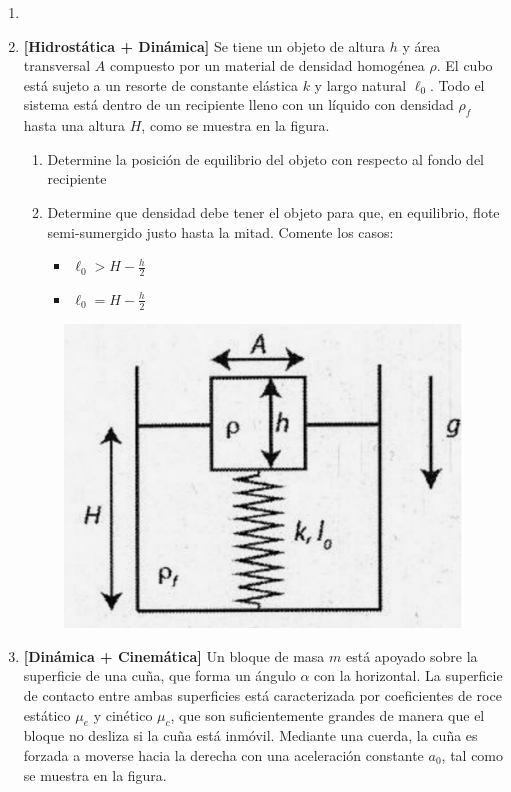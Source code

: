\documentclass[letterpaper,11pt]{article}
\begin{document}
\vspace{-1cm}
\begin{enumerate}\setlength{\itemsep}{0.4cm}

\item[]

\item \textbf{[Hidrostática + Dinámica]} Se tiene un objeto de altura $h$ y área transversal $A$ compuesto por un material de densidad homogénea $\rho$. El cubo está sujeto a un resorte de constante elástica $k$ y largo natural $\ell_0$. Todo el sistema está dentro de un recipiente lleno con un líquido con densidad $\rho_f$ hasta una altura $H$, como se muestra en la figura.
    \begin{enumerate}
        \item Determine la posición de equilibrio del objeto con respecto al fondo del recipiente
        \item Determine que densidad debe tener el objeto para que, en equilibrio, flote semi-sumergido justo hasta la mitad. Comente los casos:
        \begin{itemize}
            \item $\ell_0 > H -\frac{h}{2}$
            \item $\ell_0 = H -\frac{h}{2}$
        \end{itemize}

    \end{enumerate}
    \begin{figure}[H]
        \centering
        \includegraphics[height=0.3\textwidth]{2023-1/img/aux_16/Aux 16 - P4.PNG}
    \end{figure}

\item 
\begin{multicols}{2}
    \textbf{[Dinámica + Cinemática]} Un bloque de masa $m$ está apoyado sobre la superficie de una cuña, que forma un ángulo $\alpha$ con la horizontal. La superficie de contacto entre ambas superficies está caracterizada por coeficientes de roce estático $\mu_e$ y cinético $\mu_c$, que son suficientemente grandes de manera que el bloque no desliza si la cuña está inmóvil. Mediante una cuerda, la cuña es forzada a moverse hacia la derecha con una aceleración constante $a_0$, tal como se muestra en la figura. 


\end{multicols}
\end{enumerate}
\end{document}
